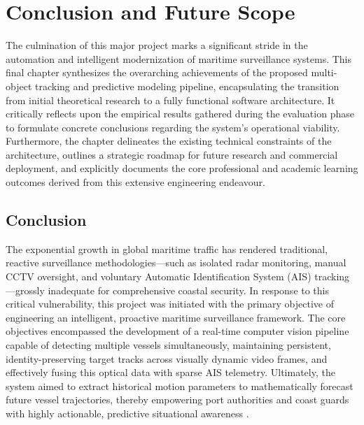 \chapter{Conclusion and Future Scope}

The culmination of this major project marks a significant stride in the automation and intelligent modernization of maritime surveillance systems. This final chapter synthesizes the overarching achievements of the proposed multi-object tracking and predictive modeling pipeline, encapsulating the transition from initial theoretical research to a fully functional software architecture. It critically reflects upon the empirical results gathered during the evaluation phase to formulate concrete conclusions regarding the system's operational viability. Furthermore, the chapter delineates the existing technical constraints of the architecture, outlines a strategic roadmap for future research and commercial deployment, and explicitly documents the core professional and academic learning outcomes derived from this extensive engineering endeavour.

\section{Conclusion}

The exponential growth in global maritime traffic has rendered traditional, reactive surveillance methodologies—such as isolated radar monitoring, manual CCTV oversight, and voluntary Automatic Identification System (AIS) tracking—grossly inadequate for comprehensive coastal security. In response to this critical vulnerability, this project was initiated with the primary objective of engineering an intelligent, proactive maritime surveillance framework. The core objectives encompassed the development of a real-time computer vision pipeline capable of detecting multiple vessels simultaneously, maintaining persistent, identity-preserving target tracks across visually dynamic video frames, and effectively fusing this optical data with sparse AIS telemetry. Ultimately, the system aimed to extract historical motion parameters to mathematically forecast future vessel trajectories, thereby empowering port authorities and coast guards with highly actionable, predictive situational awareness \citep{Ref24}.

